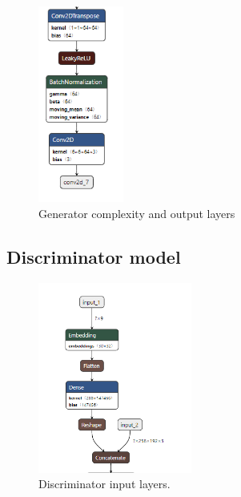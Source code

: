 \documentclass[12pt,a4paper,oneside]{memoir}
\begin{document}
    
    
      
    \begin{figure}[H]
    \centering
    \includegraphics[width=0.25\textwidth]{images/generator_4.png}
    \caption{Generator complexity and output layers}
    \centering
    \label{fig:neuron}
    \end{figure}
    
    
    
    \subsection{Discriminator model}
    \label{sec:cgandiscri}
    
    
    
    
    \begin{figure}[H]
    \centering
    \includegraphics[width=0.45\textwidth]{images/discriminator_1.png}
    \caption{Discriminator input layers.}
    \centering
    \label{fig:disc}
    \end{figure}
    
    
        
\end{document}
